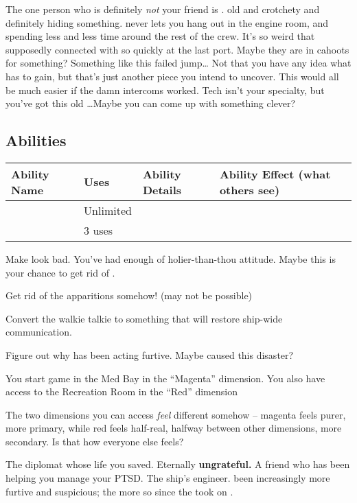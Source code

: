 \documentclass[char]{TMFHope}
\begin{document}
The one person who is definitely \emph{not} your friend is \cEng{\full}. \cEng{\They} \cEng{\are} old and crotchety and definitely hiding something. \cEng{} never lets you hang out in the engine room, and \cEng{\they} \cEng{\are} spending less and less time around the rest of the crew. It's so weird that \cEng{\they} supposedly connected with \cBoy{} so quickly at the last port. Maybe they are in cahoots for something? Something like this failed jump\ldots{} Not that you have any idea what \cEng{} has to gain, but that's just another piece you intend to uncover. This would all be much easier if the damn intercoms worked. Tech isn't your specialty, but you've got this old \iWT{}\ldots Maybe you can come up with something clever?

\subsection*{Abilities}
\begin{tabular}{|p{3cm}|p{1.5cm}|p{6.5cm}|p{5cm}|} 
 \hline
 \textbf{Ability Name} & \textbf{Uses} & \textbf{Ability Details} & \textbf{Ability Effect (what others see)} \\ 
\hline 
 \aThreat{\MYname} & Unlimited & \aThreat{\MYtext} & \aThreat{\MYeffect} \\ 
\hline
 \aFirstAid{\MYname} & 3 uses & \aFirstAid{\MYtext} & \aFirstAid{\MYeffect}\\ 
 \hline
\end{tabular}

\begin{itemz}[Goals]
	\item Make \cDip{} look bad. You've had enough of \cDip{\their} holier-than-thou attitude. Maybe this is your chance to get rid of \cDip{\them}.
	\item Get rid of the apparitions somehow! (may not be possible)
	\item Convert the walkie talkie to something that will restore ship-wide communication.
	\item Figure out why \cEng{} has been acting furtive.  Maybe \cEng{\they} caused this disaster?
\end{itemz}

\begin{itemz}[Notes]
	\item You start game in the Med Bay in the ``Magenta'' dimension. You also have access to the Recreation Room in the ``Red'' dimension
	\item The two dimensions you can access {\em feel} different somehow -- magenta feels purer, more primary, while red feels half-real, halfway between other dimensions, more secondary.  Is that how everyone else feels?
\end{itemz}

\begin{contacts}
	\contact{\cDip{}} The diplomat whose life you saved. Eternally \textbf{ungrateful.}
	\contact{\cNav{}} A friend who has been helping you manage your PTSD.
	\contact{\cEng{}} The ship's engineer. \cEng{\They} \cEng{\have} been increasingly more furtive and suspicious; the more so since the \pNew{} took on \cBoy{}.
\end{contacts}
\end{document}
